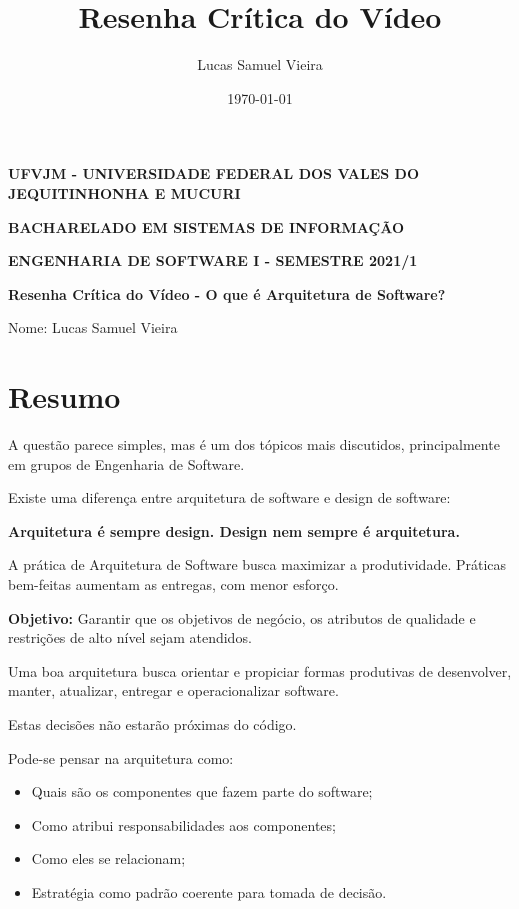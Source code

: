 \documentclass[article, a4paper, oneside, 11pt, english, brazil, sumario=tradicional]{abntex2}
\author{Lucas Samuel Vieira}
\date{\today}
\title{Resenha Crítica do Vídeo}
\begin{document}
\OnehalfSpacing
\pretextual
\textual

\begin{center}
\textbf{UFVJM - UNIVERSIDADE FEDERAL DOS VALES DO JEQUITINHONHA E MUCURI}

\textbf{BACHARELADO EM SISTEMAS DE INFORMAÇÃO}

\textbf{ENGENHARIA DE SOFTWARE I - SEMESTRE 2021/1}


\textbf{Resenha Crítica do Vídeo - O que é Arquitetura de Software?}
\end{center}

\noindent
Nome: Lucas Samuel Vieira
\newline

\section{Resumo}
\label{sec:org146e002}

A  questão parece  simples,  mas  é um  dos  tópicos mais  discutidos,
principalmente em grupos de Engenharia de Software.

Existe  uma  diferença  entre  arquitetura de  software  e  design  de
software:

\begin{center}
\textbf{Arquitetura é sempre design. Design nem sempre é arquitetura.}
\end{center}

A   prática   de   Arquitetura   de   Software   busca   maximizar   a
produtividade.  Práticas bem-feitas  aumentam as  entregas, com  menor
esforço.

\textbf{Objetivo:}  Garantir que  os objetivos  de negócio,  os atributos  de
 qualidade e restrições de alto nível sejam atendidos.

Uma boa  arquitetura busca orientar  e propiciar formas  produtivas de
desenvolver, manter, atualizar, entregar e operacionalizar software.

Estas decisões não estarão próximas do código.

Pode-se pensar na arquitetura como:
\begin{itemize}
\item Quais são os componentes que fazem parte do software;
\item Como atribui responsabilidades aos componentes;
\item Como eles se relacionam;
\item Estratégia como padrão coerente para tomada de decisão.
\end{itemize}
\end{document}
